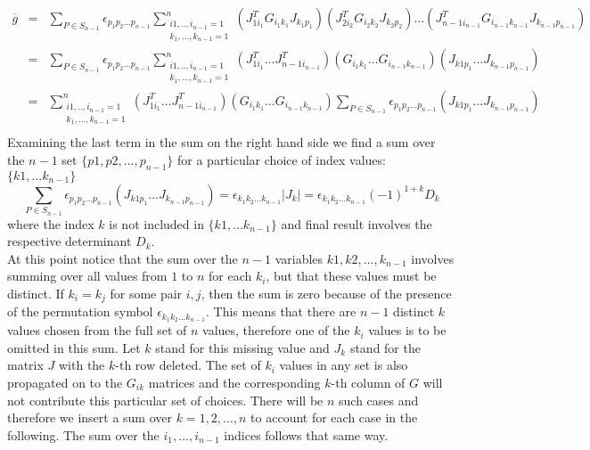 \begin{eqnarray*}
\overline{g} &=& \sum_{P \in S_{n-1}} \epsilon_{ p_1 p_2 ... p_{n-1}} \sum_{\substack{i1,..,i_{n-1} = 1 \\ k_1,...,k_{n-1}=1}}^n  
(J^T_{1i_1}G_{i_1k_1}J_{k_1p_1})
(J^T_{2i_2}G_{i_2k_2}J_{k_2p_2})...
(J^T_{n-1i_{n-1}}G_{i_{n-1}k_{n-1}}J_{k_{n-1}p_{n-1}})\\
&=& \sum_{P \in S_{n-1}} \epsilon_{ p_1 p_2 ... p_{n-1}} \sum_{\substack{i1,..,i_{n-1} = 1 \\ k_1,...,k_{n-1}=1}}^n  
(J^T_{1i_1}...J^T_{n-1i_{n-1}} )
(G_{i_1k_1}...G_{i_{n-1}k_{n-1}} )
(J_{k1p_1}...J_{k_{n-1}p_{n-1}} )\\
&=& \sum_{\substack{i1,..,i_{n-1} = 1 \\ k_1,...,k_{n-1}=1}}^n  
(J^T_{1i_1}...J^T_{n-1i_{n-1}} )
(G_{i_1k_1}...G_{i_{n-1}k_{n-1}} )
\sum_{P \in S_{n-1}} \epsilon_{ p_1 p_2 ... p_{n-1}} (J_{k1p_1}...J_{k_{n-1}p_{n-1}} )\\
\end{eqnarray*}
Examining the last term in the sum on the right hand side we find a sum over the $n-1$ set $\{p1,p2,...,p_{n-1}\}$ for a particular choice of index values: $\{k1,...k_{n-1}\}$ 
\begin{equation}
\sum_{P \in S_{n-1} }\epsilon_{ p_1 p_2 ... p_{n-1}} (J_{k1p_1}...J_{k_{n-1}p_{n-1}}) = \epsilon_{ k_1 k_2 ... k_{n-1}} | J_k | = \epsilon_{ k_1 k_2 ... k_{n-1}} (-1)^{1+k} D_k
\end{equation}
where the index $k$ is not included in $\{k1,...k_{n-1}\}$ and final result involves the respective determinant $D_k$.\\

At this point notice that the sum over the $n-1$ variables $k1,k2,...,k_{n-1}$ involves summing over all values from $1$ to $n$ for each $k_i$, but that these values must be distinct. If $k_i = k_j$ for some pair $i,j$, then the sum is
zero because of the presence of the permutation symbol $\epsilon_{ k_1 k_2 ... k_{n-1}}$. This means that there are $n-1$ distinct $k$ values chosen from the full set of $n$ values, therefore one of the $k_i$ values is to be omitted in this sum.  Let $k$ stand for this missing value and $J_k$ stand for the matrix $J$ with the $k$-th row deleted. The set of $k_i$ values in any set is also propagated on to the $G_{ik}$ matrices and the corresponding $k$-th column of $G$ will not contribute this particular set of choices. There will be $n$ such cases and therefore we insert a sum over $k=1,2,...,n$ to account for each case in the following. The sum over the $i_1,...,i_{n-1}$ indices follows that same way.

